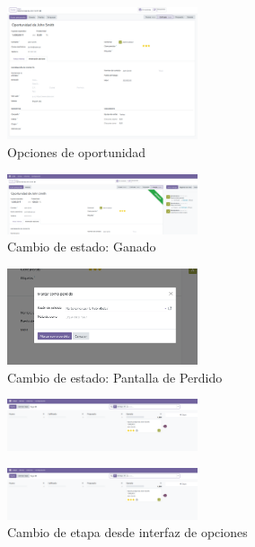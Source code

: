 \documentclass[a4paper,12pt]{article}
\begin{document}
\begin{figure}[h!]
    \centering
    \includegraphics[width=0.5\textwidth]{pr2odoo69-oportunidadOpciones.png}
    \caption{Opciones de oportunidad}
\end{figure}
\FloatBarrier

\begin{figure}[h!]
    \centering
    \includegraphics[width=0.5\textwidth]{pr2odoo70-oportunidadGanado.png}
    \caption{Cambio de estado: Ganado}
\end{figure}
\FloatBarrier

\begin{figure}[h!]
    \centering
    \includegraphics[width=0.5\textwidth]{pr2odoo71-oportunidadPerdida.png}
    \caption{Cambio de estado: Pantalla de Perdido}
\end{figure}
\FloatBarrier

\begin{figure}[h!]
    \centering
    \includegraphics[width=0.5\textwidth]{pr2odoo72-cambioDeEtapa.png}
    \caption{}
\end{figure}
\FloatBarrier

\begin{figure}[h!]
    \centering
    \includegraphics[width=0.5\textwidth]{pr2odoo72-cambioDeEtapa.png}
    \caption{Cambio de etapa desde interfaz de opciones}
\end{figure}
\FloatBarrier
\end{document}
